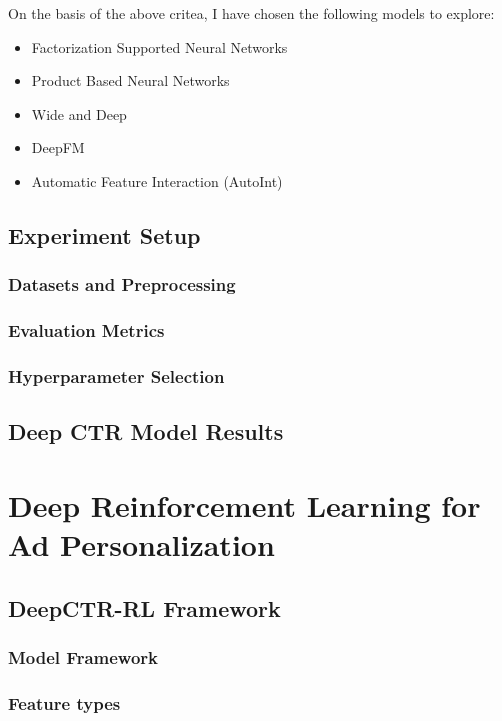 \documentclass{mldsmsc}
\begin{document}
On the basis of the above critea, I have chosen the following models to explore:

\begin{itemize}
\item Factorization Supported Neural Networks
\item Product Based Neural Networks
\item Wide and Deep
\item DeepFM
\item Automatic Feature Interaction (AutoInt)
\end{itemize}

\section{Experiment Setup}

\subsection{Datasets and Preprocessing}

\subsection{Evaluation Metrics}

\subsection{Hyperparameter Selection}

\section{Deep CTR Model Results}

\chapter{Deep Reinforcement Learning for Ad Personalization}
\label{chap:deep-rl-for-ad-personalization}

\section{DeepCTR-RL Framework}

\subsection{Model Framework}

\subsection{Feature types}
\end{document}
